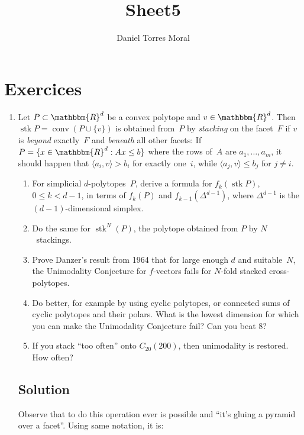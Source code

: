 \documentclass[11pt]{amsart}
\title{Sheet5}
\author{Daniel Torres Moral}
\newcommand{\R}{\mathbbm{R}}
\DeclareMathOperator{\conv}{conv}
\DeclareMathOperator{\stack}{stk}
\begin{document}
  
  \maketitle
  
  \section{Exercices}
  
    \begin{enumerate}

      \setlength{\itemsep}{1ex}
         
      \item Let $P\subset\R^d$ be a convex polytope and $v\in\R^d$. Then $\stack P=\conv(P\cup\{v\})$ is obtained from~$P$ by \emph{stacking} on the facet~$F$ if $v$ is \emph{beyond} exactly~$F$ and \emph{beneath} all other facets: If $P=\{x\in\R^d: Ax\le b\}$ where the rows of~$A$ are $a_1,\dots, a_m$, it should happen that $\langle a_i,v\rangle > b_i$ for exactly one~$i$, while $\langle a_j,v\rangle \le b_j$ for  $j\ne i$.

      \begin{enumerate}
         \item For simplicial $d$-polytopes~$P$, derive a formula for $f_k(\stack P)$, $0\le k<d-1$,  in terms of $f_k(P)$ and $f_{k-1}(\Delta^{d-1})$, where $\Delta^{d-1}$ is the $(d-1)$-dimensional simplex.

         \item Do the same for $\stack^{N}(P)$, the polytope obtained from $P$ by $N$~stackings.

         \item Prove Danzer's result from 1964 that for large enough $d$ and suitable~$N$, the Unimodality Conjecture for $f$-vectors fails for $N$-fold stacked cross-polytopes.

         \item Do better, for example by using cyclic polytopes, or connected sums of cyclic polytopes and their polars. What is the lowest dimension for which you can make the Unimodality Conjecture fail? Can you beat 8?

         \item If you stack ``too often'' onto $C_{20}(200)$, then unimodality is restored. How often?

       \end{enumerate}
       
       \subsection{Solution}
       Observe that to do this operation ever is possible and ``it's gluing a pyramid over a facet''. Using same notation, it is:
       

\end{enumerate}
\end{document}
